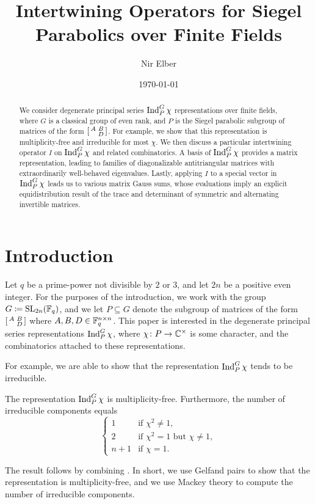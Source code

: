 \documentclass{amsart}
\title{Intertwining Operators for Siegel Parabolics over Finite Fields}
\author{Nir Elber}
\date{\today}
\begin{document}
\begin{abstract}
    We consider degenerate principal series $\operatorname{Ind}_P^G\chi$ representations over finite fields, where $G$ is a classical group of even rank, and $P$ is the Siegel parabolic subgroup of matrices of the form $\begin{bsmallmatrix}
        A & B \\ & D
    \end{bsmallmatrix}$. For example, we show that this representation is multiplicity-free and irreducible for most $\chi$. We then discuss a particular intertwining operator $I$ on $\operatorname{Ind}_P^G\chi$ and related combinatorics. A basis of $\operatorname{Ind}_P^G\chi$ provides a matrix representation, leading to families of diagonalizable antitriangular matrices with extraordinarily well-behaved eigenvalues. Lastly, applying $I$ to a special vector in $\operatorname{Ind}_P^G\chi$ leads us to various matrix Gauss sums, whose evaluations imply an explicit equidistribution result of the trace and determinant of symmetric and alternating invertible matrices.
\end{abstract}

\maketitle


\tableofcontents

\section{Introduction}
Let $q$ be a prime-power not divisible by $2$ or $3$, and let $2n$ be a positive even integer. For the purposes of the introduction, we work with the group $G\coloneqq\operatorname{SL}_{2n}(\mathbb F_q)$, and we let $P\subseteq G$ denote the subgroup of matrices of the form $\begin{bsmallmatrix}
    A & B \\ & D
\end{bsmallmatrix}$ where $A,B,D\in\mathbb F_q^{n\times n}$. This paper is interested in the degenerate principal series representations $\operatorname{Ind}_P^G\chi$, where $\chi\colon P\to\mathbb C^\times$ is some character, and the combinatorics attached to these representations.

For example, we are able to show that the representation $\operatorname{Ind}_P^G\chi$ tends to be irreducible.
\begin{theorem}
    The representation $\operatorname{Ind}_P^G\chi$ is multiplicity-free. Furthermore, the number of irreducible components equals
    \[\begin{cases}
        1 & \text{if }\chi^2\ne1, \\
        2 & \text{if }\chi^2=1\text{ but }\chi\ne1, \\
        n+1 & \text{if }\chi=1.
    \end{cases}\]
\end{theorem}
The result follows by combining . In short, we use Gelfand pairs to show that the representation is multiplicity-free, and we use Mackey theory to compute the number of irreducible components.
\end{document}
